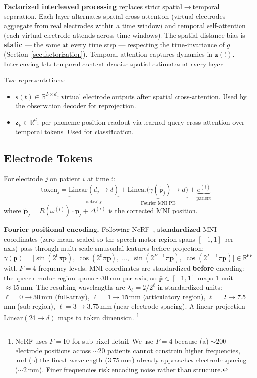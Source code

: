 \documentclass[11pt,letterpaper]{article}
\newcommand{\bfp}{\mathbf{p}}
\newcommand{\bfz}{\mathbf{z}}
\newcommand{\R}{\mathbb{R}}
\begin{document}
\textbf{Factorized interleaved processing} replaces strict spatial$\to$temporal separation. Each layer alternates spatial cross-attention (virtual electrodes aggregate from real electrodes within a time window) and temporal self-attention (each virtual electrode attends across time windows). The spatial distance bias is \textbf{static} --- the same at every time step --- respecting the time-invariance of $g$ (Section~\ref{sec:factorization}). Temporal attention captures dynamics in $\bfz(t)$. Interleaving lets temporal context denoise spatial estimates at every layer.

Two representations:
\begin{itemize}[leftmargin=2em]
\item $s(t) \in \R^{L \times d}$: virtual electrode outputs after spatial cross-attention. Used by the observation decoder for reprojection.
\item $\bfz_p \in \R^d$: per-phoneme-position readout via learned query cross-attention over temporal tokens. Used for classification.
\end{itemize}


\subsection{Electrode Tokens}\label{sec:tokens}

For electrode $j$ on patient $i$ at time $t$:
\begin{equation}
\text{token}_j = \underbrace{\text{Linear}(d_j \to d)}_{\text{activity}} + \underbrace{\text{Linear}\bigl(\gamma(\tilde{\bfp}_j) \to d\bigr)}_{\text{Fourier MNI PE}} + \underbrace{e^{(i)}}_{\text{patient}}
\end{equation}
where $\tilde{\bfp}_j = R(\omega^{(i)}) \cdot \bfp_j + \Delta^{(i)}$ is the corrected MNI position.

\textbf{Fourier positional encoding.} Following NeRF~\cite{mildenhall2020}, \textbf{standardized} MNI coordinates (zero-mean, scaled so the speech motor region spans $[{-}1, 1]$ per axis) pass through multi-scale sinusoidal features before projection:
\begin{equation}
\gamma(\bar{\bfp}) = \bigl[\sin(2^0 \pi \bar{\bfp}),\; \cos(2^0 \pi \bar{\bfp}),\; \ldots,\; \sin(2^{F-1} \pi \bar{\bfp}),\; \cos(2^{F-1} \pi \bar{\bfp})\bigr] \in \R^{6F}
\end{equation}
with $F{=}4$ frequency levels. MNI coordinates are standardized \textbf{before} encoding: the speech motor region spans ${\sim}30$\,mm per axis, so $\bar{\bfp} \in [{-}1, 1]$ maps 1 unit $\approx 15$\,mm. The resulting wavelengths are $\lambda_\ell = 2/2^\ell$ in standardized units: $\ell{=}0 \to 30$\,mm (full-array), $\ell{=}1 \to 15$\,mm (articulatory region), $\ell{=}2 \to 7.5$\,mm (sub-region), $\ell{=}3 \to 3.75$\,mm (near electrode spacing). A linear projection $\text{Linear}(24 \to d)$ maps to token dimension.%
\footnote{NeRF uses $F{=}10$ for sub-pixel detail. We use $F{=}4$ because (a) ${\sim}200$ electrode positions across ${\sim}20$ patients cannot constrain higher frequencies, and (b) the finest wavelength ($3.75$\,mm) already approaches electrode spacing (${\sim}2$\,mm). Finer frequencies risk encoding noise rather than structure.}
\end{document}
